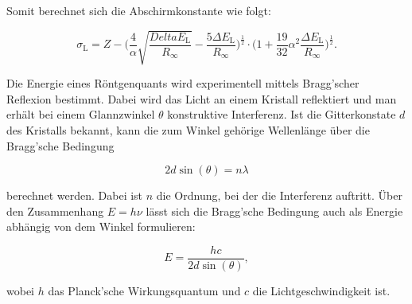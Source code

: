 Somit berechnet sich die Abschirmkonstante wie folgt:

\begin{equation}
    \label{eqn:abschirm}
    \sigma_\text{L} = Z - \bigg( \frac{4}{\alpha} \sqrt{\frac{Delta E_\text{L}}{R_\infty }} - \frac{5 \Delta E_\text{L}}{R_\infty} \bigg)^\frac{1}{2} \cdot \bigg( 1 + \frac{19}{32} \alpha^2 \frac{\Delta E_\text{L}}{R_\infty} \bigg)^\frac{1}{2}.
\end{equation}

Die Energie eines Röntgenquants wird experimentell mittels Bragg'scher Reflexion bestimmt.
Dabei wird das Licht an einem Kristall reflektiert und man erhält bei einem Glannzwinkel $\theta$ konstruktive Interferenz.
Ist die Gitterkonstate $d$ des Kristalls bekannt, kann die zum Winkel gehörige Wellenlänge über die Bragg'sche Bedingung

\begin{equation}
    \label{eqn:bragg}
    2 d \sin (\theta) = n \lambda
\end{equation}

berechnet werden. Dabei ist $n$ die Ordnung, bei der die Interferenz auftritt.
Über den Zusammenhang $E = h \nu$ lässt sich die Bragg'sche Bedingung auch als Energie abhängig von dem Winkel formulieren:

\begin{equation}
    \label{eqn:bragg-energie}
    E = \frac{h c}{2 d \sin (\theta )},
\end{equation}

wobei $h$ das Planck'sche Wirkungsquantum und $c$ die Lichtgeschwindigkeit ist.
